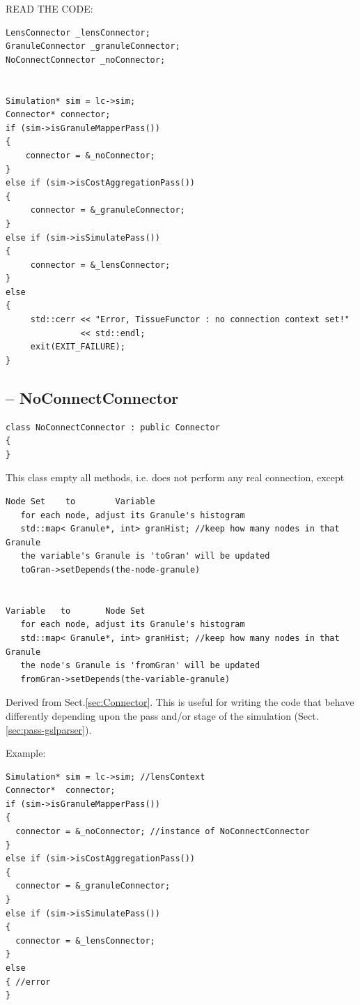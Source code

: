 READ THE CODE:
\begin{lstlisting}
LensConnector _lensConnector; 
GranuleConnector _granuleConnector;
NoConnectConnector _noConnector;


Simulation* sim = lc->sim;
Connector* connector;
if (sim->isGranuleMapperPass())
{
    connector = &_noConnector;
}
else if (sim->isCostAggregationPass())
{
     connector = &_granuleConnector;
}
else if (sim->isSimulatePass())
{
     connector = &_lensConnector;
}
else
{
     std::cerr << "Error, TissueFunctor : no connection context set!"
               << std::endl;
     exit(EXIT_FAILURE);
}
\end{lstlisting}



\subsection{-- NoConnectConnector}
\label{sec:NoConnectConnector}


\begin{verbatim}
class NoConnectConnector : public Connector
{
}
\end{verbatim}

This class empty all methods, i.e. does not perform any real connection, except

\begin{verbatim}
Node Set    to        Variable
   for each node, adjust its Granule's histogram
   std::map< Granule*, int> granHist; //keep how many nodes in that Granule
   the variable's Granule is 'toGran' will be updated
   toGran->setDepends(the-node-granule)
   
   
Variable   to       Node Set   
   for each node, adjust its Granule's histogram
   std::map< Granule*, int> granHist; //keep how many nodes in that Granule
   the node's Granule is 'fromGran' will be updated
   fromGran->setDepends(the-variable-granule)
\end{verbatim}


Derived from Sect.\ref{sec:Connector}. This is useful for writing the code that
behave differently depending upon the pass and/or stage of the simulation
(Sect.\ref{sec:pass-gslparser}).

Example:
\begin{verbatim}
Simulation* sim = lc->sim; //lensContext
Connector*  connector;
if (sim->isGranuleMapperPass())
{
  connector = &_noConnector; //instance of NoConnectConnector
}
else if (sim->isCostAggregationPass())
{
  connector = &_granuleConnector;
}
else if (sim->isSimulatePass())
{
  connector = &_lensConnector;
}
else
{ //error
}
\end{verbatim}

